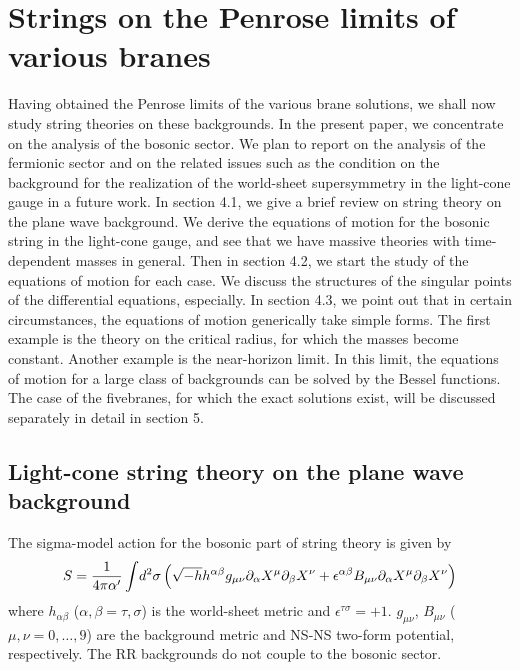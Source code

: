 \documentclass[a4paper,12pt]{article}
\begin{document}
\section{Strings on the Penrose limits of various branes}
Having obtained the Penrose limits of the various
brane solutions, we shall now study string theories 
on these backgrounds.
In the present paper, we concentrate on the analysis of 
the bosonic sector. We plan to report on the analysis 
of the fermionic sector and on the related issues such as
the condition on the background
for the realization of the world-sheet 
supersymmetry in the light-cone gauge in a future work.
In section 4.1, we give a brief review on string 
theory on the plane wave background. We derive the
equations of motion for the bosonic string in the 
light-cone gauge, and see that we have massive theories
with time-dependent masses in general.
Then in section 4.2, we start the study of
the equations of motion for each case.  
We discuss the structures of the singular points of 
the differential equations, especially.
In section 4.3, we point out that in 
certain circumstances, the equations of motion 
generically take simple forms. The first example
is the theory on the critical radius, 
for which the masses become constant. Another example
is the near-horizon limit.
In this limit, the equations of motion for a large class
of backgrounds can be solved by the Bessel functions.
The case of the fivebranes, for which the exact 
solutions exist, will be discussed separately in detail
in section 5.

\subsection{Light-cone string theory on the plane wave background}
The sigma-model action for the bosonic part of string theory
is given by
\begin{equation}
S={1\over 4\pi \alpha'}\int\! d^2\sigma \left(\sqrt{-h}
h^{\alpha\beta}g_{\mu\nu}
\partial_\alpha X^\mu\partial_\beta X^\nu
+\epsilon^{\alpha\beta}B_{\mu\nu}
\partial_\alpha X^\mu\partial_\beta X^\nu\right)
\label{sigmamodel}
\end{equation}
where $h_{\alpha\beta}$ ($\alpha,\beta=\tau,\sigma$) is the 
world-sheet metric and $\epsilon^{\tau\sigma}=+1$.
$g_{\mu\nu}$, $B_{\mu\nu}$ ($\mu,\nu=0,\ldots,9$) are the 
background metric and NS-NS two-form potential, respectively.
The RR backgrounds do not couple to the bosonic sector.
\end{document}
